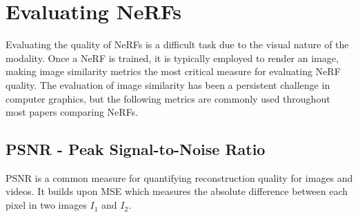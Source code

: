 

\begin{comment}
Exhaustive matching:
time complexity: O(n^2), where n is the number of images
memory complexity: O(n) for storing all images, O(n^2) for storing the results of the matching process

Sequential matching:
time complexity: O(n * k), where n is the number of images and k is the number of adjacent images each image is matched against
memory complexity: O(n * k)

Vocabulary tree-based matching:
time complexity: O(n^2), assuming that the size of the vocabulary tree is constant and not a function of the number n of images
memory complexity: O(n * k), where k is the number of top-retrieved images that each image is matched against
There is definitively literature on the topic of the time and memory complexity of vocabulary tree-based matching and image retrieval
\end{comment}




\section{Evaluating NeRFs} \label{sec:evaluating-nerfs}
Evaluating the quality of NeRFs is a difficult task due to the visual nature of the modality. Once a NeRF is trained, it is typically employed to render an image, making image similarity metrics the most critical measure for evaluating NeRF quality. The evaluation of image similarity has been a persistent challenge in computer graphics, but the following metrics are commonly used throughout most papers comparing NeRFs.


\subsection{PSNR - Peak Signal-to-Noise Ratio}
PSNR is a common measure for quantifying reconstruction quality for images and videos. It builds upon MSE which measures the absolute difference between each pixel in two images $I_1$ and $I_2$.


